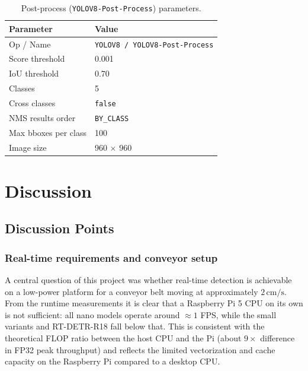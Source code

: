 \documentclass[12pt,a4paper]{report}
\begin{document}
\begin{table}[!tb]
  \centering
  \caption{Post-process (\texttt{YOLOV8-Post-Process}) parameters.}
  \label{tab:nms-params}
  \begin{tabular}{ll}
    \toprule
    Parameter & Value \\
    \midrule
    Op / Name & \texttt{YOLOV8 / YOLOV8-Post-Process} \\
    Score threshold & 0.001 \\
    IoU threshold & 0.70 \\
    Classes & 5 \\
    Cross classes & \texttt{false} \\
    NMS results order & \texttt{BY\_CLASS} \\
    Max bboxes per class & 100 \\
    Image size & 960 $\times$ 960 \\
    \bottomrule
  \end{tabular}
\end{table}



\chapter{Discussion}
\section{Discussion Points}

\subsection{Real-time requirements and conveyor setup}
A central question of this project was whether real-time detection is achievable on a low-power
platform for a conveyor belt moving at approximately \(2\,\text{cm/s}\).
From the runtime measurements it is clear that a Raspberry Pi 5 CPU on its own is not
sufficient: all nano models operate around \(\approx 1\) FPS, while the small variants
and RT-DETR-R18 fall below that.
This is consistent with the theoretical FLOP ratio between the host CPU and the Pi
(about \(9\times\) difference in FP32 peak throughput) and reflects the limited
vectorization and cache capacity on the Raspberry Pi compared to a desktop CPU. \\
\end{document}
